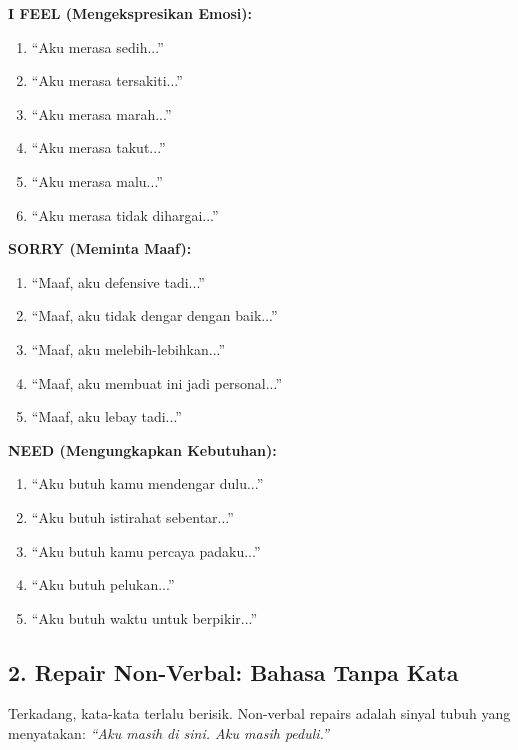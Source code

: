 \begin{tipbox}
\textbf{I FEEL (Mengekspresikan Emosi):}
\begin{enumerate}[itemsep=0.1cm]
    \item ``Aku merasa sedih...''
    \item ``Aku merasa tersakiti...''
    \item ``Aku merasa marah...''
    \item ``Aku merasa takut...''
    \item ``Aku merasa malu...''
    \item ``Aku merasa tidak dihargai...''
\end{enumerate}

\textbf{SORRY (Meminta Maaf):}
\begin{enumerate}[itemsep=0.1cm]
    \item ``Maaf, aku defensive tadi...''
    \item ``Maaf, aku tidak dengar dengan baik...''
    \item ``Maaf, aku melebih-lebihkan...''
    \item ``Maaf, aku membuat ini jadi personal...''
    \item ``Maaf, aku lebay tadi...''
\end{enumerate}

\textbf{NEED (Mengungkapkan Kebutuhan):}
\begin{enumerate}[itemsep=0.1cm]
    \item ``Aku butuh kamu mendengar dulu...''
    \item ``Aku butuh istirahat sebentar...''
    \item ``Aku butuh kamu percaya padaku...''
    \item ``Aku butuh pelukan...''
    \item ``Aku butuh waktu untuk berpikir...''
\end{enumerate}
\end{tipbox}

\subsection{2. Repair Non-Verbal: Bahasa Tanpa Kata}

Terkadang, kata-kata terlalu berisik. Non-verbal repairs adalah sinyal tubuh yang menyatakan: \textit{``Aku masih di sini. Aku masih peduli.''}

